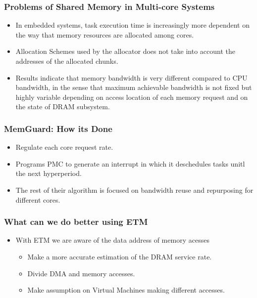 \documentclass{beamer}
\begin{document}
\begin{frame}
    \frametitle{Problems of Shared Memory in Multi-core Systems}
    \begin{itemize}
        \item In embedded systems, task execution time is increasingly more
            dependent on the way that memory resources are allocated among
            cores.
        \item Allocation Schemes used by the allocator does not take into
            account the addresses of the allocated chunks.
        \item Results indicate that memory bandwidth is very different
            compared to CPU bandwidth, in the sense that maximum achievable
            bandwidth is not fixed but highly variable depending on access
            location of each memory request and on the state of DRAM subsystem.
    \end{itemize}
\end{frame}

\begin{frame}
    \frametitle{MemGuard: How its Done}
    \begin{itemize}
        \item Regulate each core request rate.
        \item Programs PMC to generate an interrupt in which it deschedules
            tasks unitl the next hyperperiod.
        \item The rest of their algorithm is focused on bandwidth reuse and
            repurposing for different cores.
    \end{itemize}
\end{frame}

\begin{frame}
    \frametitle{What can we do better using ETM}
    \begin{itemize}
        \item With ETM we are aware of the data address of memory acesses
            \begin{itemize}
                \item Make a more accurate estimation of the DRAM service rate.
                \item Divide DMA and memory accesses.
                \item Make assumption on Virtual Machines making different
                    accesses.
            \end{itemize}
    \end{itemize}
\end{frame}
\end{document}
